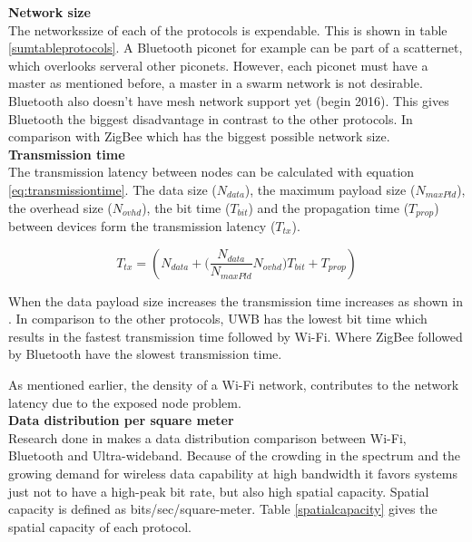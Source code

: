 \documentclass[10pt,a4paper]{article}
\begin{document}
\textbf{Network size}\\
The networkssize of each of the protocols is expendable. This is shown in table \ref{sumtableprotocols}. A Bluetooth piconet for example can be part of a scatternet, which overlooks serveral other piconets. However, each piconet must have a master as mentioned before, a master in a swarm network is not desirable. Bluetooth also doesn't have mesh network support yet (begin 2016). \cite{bluetoothmesh} This gives Bluetooth the biggest disadvantage in contrast to the other protocols. In comparison with ZigBee which has the biggest possible network size.\\


\textbf{Transmission time}\\
The transmission latency between nodes can be calculated with equation \ref{eq:transmissiontime}.\cite{comparitivestudywirelessprotocols} The data size ($N_{data}$), the maximum payload size ($N_{maxPld}$), the overhead size ($N_{ovhd}$), the bit time ($T_{bit}$) and the propagation time ($T_{prop}$) between devices form the transmission latency ($T_{tx}$). 

\begin{equation}
    T_{tx}=(N_{data} + \Bigg(\frac{N_{data}}{N_{maxPld}} N_{ovhd} \Bigg) T_{bit} + T_{prop})
    \label{eq:transmissiontime}
\end{equation}

When the data payload size increases the transmission time increases as shown in \cite{comparitivestudywirelessprotocols}. In comparison to the other protocols, UWB has the lowest bit time which results in the fastest transmission time followed by Wi-Fi. Where ZigBee followed by Bluetooth have the slowest transmission time.

As mentioned earlier, the density of a Wi-Fi network, contributes to the network latency due to the exposed node problem.\cite{combook} \\

\textbf{Data distribution per square meter}\\
Research done in \cite{ultrawidebandshortmediumrange} makes a data distribution comparison between Wi-Fi, Bluetooth and Ultra-wideband. Because of the crowding in the spectrum and the growing demand for wireless data capability at high bandwidth it favors systems just not to have a high-peak bit rate, but also high spatial capacity. Spatial capacity is defined as bits/sec/square-meter. \cite{ultrawidebandshortmediumrange} Table \ref{spatialcapacity} gives the spatial capacity of each protocol.
\end{document}
